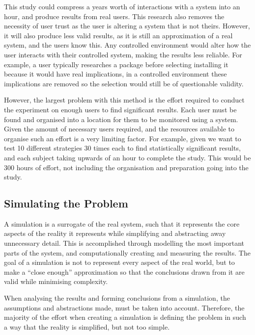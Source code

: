 This study could compress a years worth of interactions with a system into an hour, and produce results from real users. 
This research also removes the necessity of user trust as the user is altering a system that is not theirs.
However, it will also produce less valid results, as it is still an approximation of a real system, and the users know this.
Any controlled environment would alter how the user interacts with their controlled system, making the results less reliable.
For example, a user typically researches a package before selecting installing it because it would have real implications, 
in a controlled environment these implications are removed so the selection would still be of questionable validity.

However, the largest problem with this method is the effort required to conduct the experiment on enough users to find significant results.
Each user must be found and organised into a location for them to be monitored using a system.
Given the amount of necessary users required, and the resources available to organise such an effort is a very limiting factor.
For example, given we want to test 10 different strategies 30 times each to find statistically significant results, 
and each subject taking upwards of an hour to complete the study.
This would be 300 hours of effort, not including the organisation and preparation going into the study.

\subsection{Simulating the Problem}
A simulation is a surrogate of the real system, 
such that it represents the core aspects of the reality it represents while simplifying and abstracting away unnecessary detail.
This is accomplished through modelling the most important parts of the system, 
and computationally creating and measuring the results. 
The goal of a simulation is not to represent every aspect of the real world, 
but to make a ``close enough'' approximation so that the conclusions drawn from it are valid while minimising complexity.

When analysing the results and forming conclusions from a simulation, 
the assumptions and abstractions made, must be taken into account.
Therefore, the majority of the effort when creating a simulation is defining the problem in such a way that the reality is simplified, but not too simple.

